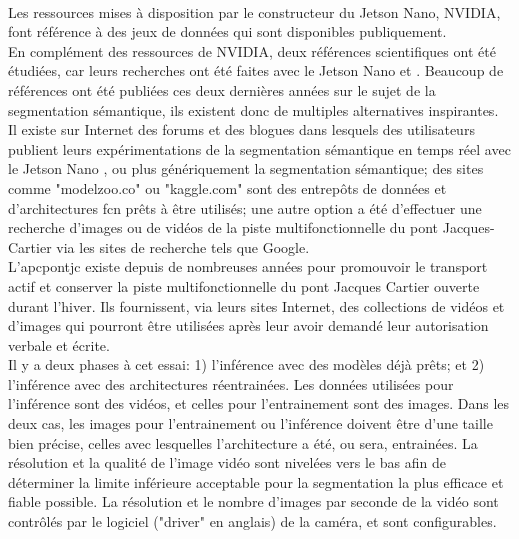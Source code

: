 ﻿\label{metho:data}
\vspace{0.5\baselineskip}
\\
Les ressources mises à disposition par le constructeur du Jetson Nano, NVIDIA, font référence à des jeux de données qui sont disponibles publiquement.
\vspace{0.5\baselineskip}
\\
\noindent En complément des ressources de NVIDIA, deux références scientifiques ont été étudiées, car leurs recherches ont été faites avec le Jetson Nano \parencite{nguyen_mavnet_2019} et \parencite{zheng_real-time_2020}. Beaucoup de références ont été publiées ces deux dernières années sur le sujet de la segmentation sémantique, ils existent donc de multiples alternatives inspirantes.
\vspace{0.5\baselineskip}
\\
\noindent Il existe sur Internet des forums et des blogues dans lesquels des utilisateurs publient leurs expérimentations de la segmentation sémantique en temps réel avec le Jetson Nano \parencite{dustin_realtime_2019}, ou plus génériquement la segmentation sémantique; des sites comme "modelzoo.co" ou "kaggle.com" sont des entrepôts de données et d'architectures \acrshort{fcn} prêts à être utilisés; une autre option a été d'effectuer une recherche d'images ou de vidéos de la piste multifonctionnelle du pont Jacques-Cartier via les sites de recherche tels que Google. 
\vspace{0.5\baselineskip}
\\
\noindent L'\acrlong{apcpontjc} existe depuis de nombreuses années pour promouvoir le transport actif et conserver la piste multifonctionnelle du pont Jacques Cartier ouverte durant l'hiver. Ils fournissent, via leurs sites Internet, des collections de vidéos et d'images qui pourront être utilisées après leur avoir demandé leur autorisation verbale et écrite. \parencite{association_des_pietons_et_cyclistes_du_pont_jacques-cartier_pontjacques-cartier365com_2020, association_des_pietons_et_cyclistes_pont_jacques-cartier_flickr_2020}
\vspace{0.5\baselineskip}
\\
Il y a deux phases à cet essai: 1) l'inférence avec des modèles déjà prêts; et 2) l'inférence avec des architectures réentrainées. Les données utilisées pour l'inférence sont des vidéos, et celles pour l'entrainement sont des images. Dans les deux cas, les images pour l'entrainement ou l'inférence doivent être d'une taille bien précise, celles avec lesquelles l'architecture a été, ou sera, entrainées. La résolution et la qualité de l'image vidéo sont nivelées vers le bas afin de déterminer la limite inférieure acceptable pour la segmentation la plus efficace et fiable possible. La résolution et le nombre d'images par seconde de la vidéo sont contrôlés par le logiciel ("driver" en anglais) de la caméra, et sont configurables. 
